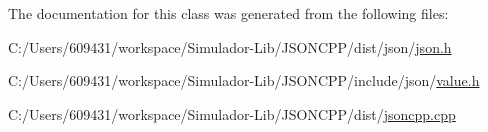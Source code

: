 The documentation for this class was generated from the following files\+:\begin{DoxyCompactItemize}
\item 
C\+:/\+Users/609431/workspace/\+Simulador-\/\+Lib/\+J\+S\+O\+N\+C\+P\+P/dist/json/\hyperlink{dist_2json_2json_8h}{json.\+h}\item 
C\+:/\+Users/609431/workspace/\+Simulador-\/\+Lib/\+J\+S\+O\+N\+C\+P\+P/include/json/\hyperlink{value_8h}{value.\+h}\item 
C\+:/\+Users/609431/workspace/\+Simulador-\/\+Lib/\+J\+S\+O\+N\+C\+P\+P/dist/\hyperlink{jsoncpp_8cpp}{jsoncpp.\+cpp}\end{DoxyCompactItemize}
